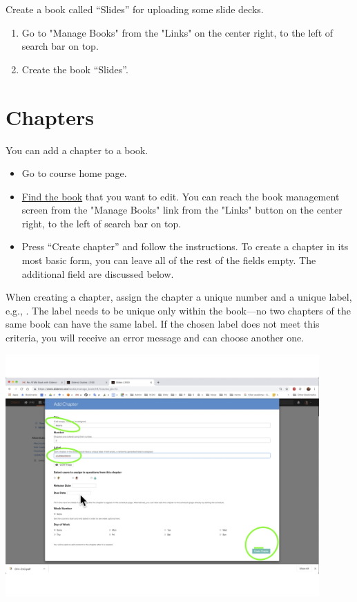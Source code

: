 \begin{exercise}
Create a book called ``Slides'' for uploading some slide decks. 
\begin{enumerate}
\item Go to "Manage Books" from the "Links" on the center right, to
the left of search bar on top.
\item Create the book ``Slides''.
\end{enumerate}
\end{exercise}

\section{Chapters}
\label{guide:chapter}

\begin{gram}
\label{guide:chapter::create}
You can add a chapter to a book.  
\begin{itemize}
\item Go to course home page.
\item \href{guide::author::go-book-management}{Find the book} that you
  want to edit.  You can reach the book management screen from the
  "Manage Books" link from the "Links" button on the center right, to
  the left of search bar on top.

\item  Press ``Create chapter'' and follow the instructions.  To create a chapter in its most basic form, you can leave all of the rest of the fields empty.  The additional field are discussed below.
\end{itemize}
%

When creating a chapter, assign the chapter a unique number and a unique label, e.g., .  
%
The label needs to be unique only within the book---no two chapters of
the same book can have the same label.
%
If the chosen label does not meet this criteria, you will receive an error message and can choose another one.

\includegraphics[width=0.9\textwidth]{staff/media/create-chapter.jpg}
\end{gram}

